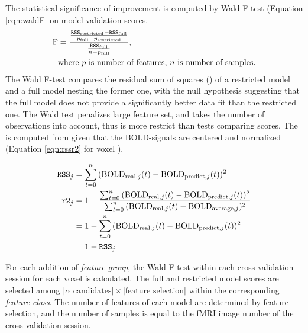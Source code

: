The statistical significance of improvement is computed by Wald F-test (Equation \ref{eqn:waldF} on model validation scores. 
\begin{equation}
    \begin{split}
    \text{F} &= \frac{\frac{\texttt{RSS}_{\text{restricted}}-\texttt{RSS}_{\text{full}}}{p_{\text{full}}-p_{\text{restricted}}}}{\frac{\texttt{RSS}_{\text{full}}}{n-p_{\text{full}}}}, \\
    &\text{where } p\text{ is number of features, }n\text{ is number of samples.}
    \end{split}
\label{eqn:waldF}
    \end{equation}
The Wald F-test compares the residual sum of squares () of a restricted model and a full model nesting the former one, with the null hypothesis suggesting that the full model does not provide a significantly better data fit than the restricted one. The Wald test penalizes large feature set, and takes the number of observations into account, thus is more restrict than tests comparing  scores. The  is computed from  given that the BOLD-signals are centered and normalized (Equation \ref{eqn:rssr2} for voxel ).


\begin{equation}
    \begin{split}
         \texttt{RSS}_j &= \sum_{t=0}^{n} {(\text{BOLD}_{\text{real}, j}(t) - \text{BOLD}_{\text{predict}, j}(t))^2} \\
         \texttt{r2}_j &= 1 - \frac{\sum_{t=0}^{n}{(\text{BOLD}_{\text{real}, j}(t) - \text{BOLD}_{\text{predict}, j}(t))^2}}{\sum_{t=0}^{n}{(\text{BOLD}_{\text{real}, j}(t) - \text{BOLD}_{\text{average}, j})^2}} \\
         &= 1 - \sum_{t=0}^{n}{(\text{BOLD}_{\text{real}, j}(t) - \text{BOLD}_{\text{predict}, j}(t))^2} \\
         &= 1- \texttt{RSS}_j
        \end{split}
\label{eqn:rssr2}
    \end{equation}

For each addition of \emph{feature group}, the Wald F-test within each cross-validation session for each voxel is calculated. The full and restricted model scores are selected among \( \lvert \alpha \text{ candidates} \rvert \times \lvert \text{feature selection} \rvert \) within the corresponding \emph{feature class}. The number of features of each model are determined by feature selection, and the number of samples is equal to the fMRI image number of the cross-validation session.

